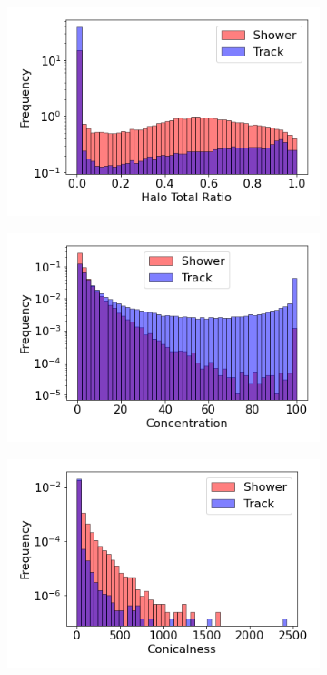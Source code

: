 \begin{figure}[b!]
        \centering
        \begin{subfigure}[b]{0.45\textwidth}
            \centering
            \includegraphics[width=\textwidth]{Feature_Halo_Total_Ratio}
            \caption{}%
        \end{subfigure}
        \hfill
        \begin{subfigure}[b]{0.45\textwidth}  
            \centering 
            \includegraphics[width=\textwidth]{Feature_Concentration}
            \caption{}%
        \end{subfigure}
        \hfill
        \begin{subfigure}[b]{0.45\textwidth}  
            \centering 
            \includegraphics[width=\textwidth]{Feature_Conicalness}

\end{subfigure}
\end{figure}
